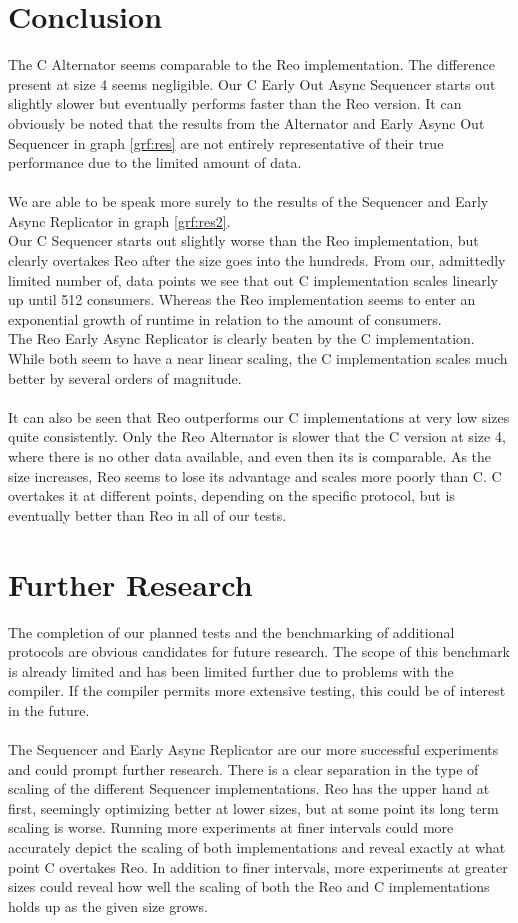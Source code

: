 \section{Conclusion}
The C Alternator seems comparable to the Reo implementation. The difference present at size 4 seems negligible. Our C Early Out Async Sequencer starts out slightly slower but eventually performs faster than the Reo version. It can obviously be noted that the results from the Alternator and Early Async Out Sequencer in graph \ref{grf:res} are not entirely representative of their true performance due to the limited amount of data.\\\\
%
We are able to be speak more surely to the results of the Sequencer and Early Async Replicator in graph \ref{grf:res2}. \\
Our C Sequencer starts out slightly worse than the Reo implementation, but clearly overtakes Reo after the size goes into the hundreds. From our, admittedly limited number of, data points we see that out C implementation scales linearly up until 512 consumers. Whereas the Reo implementation seems to enter an exponential growth of runtime in relation to the amount of consumers.\\
The Reo Early Async Replicator is clearly beaten by the C implementation. While both seem to have a near linear scaling, the C implementation scales much better by several orders of magnitude.\\\\
%
It can also be seen that Reo outperforms our C implementations at very low sizes quite consistently. Only the Reo Alternator is slower that the C version at size 4, where there is no other data available, and even then its is comparable. As the size increases, Reo seems to lose its advantage and scales more poorly than C. C overtakes it at different points, depending on the specific protocol, but is eventually better than Reo in all of our tests.

\section{Further Research}
The completion of our planned tests and the benchmarking of additional protocols are obvious candidates for future research. The scope of this benchmark is already limited and has been limited further due to problems with the compiler. If the compiler permits more extensive testing, this could be of interest in the future.\\\\
%
The Sequencer and Early Async Replicator are our more successful experiments and could prompt further research.
There is a clear separation in the type of scaling of the different Sequencer implementations. Reo has the upper hand at first, seemingly optimizing better at lower sizes, but at some point its long term scaling is worse. Running more experiments at finer intervals could more accurately depict the scaling of both implementations and reveal exactly at what point C overtakes Reo. In addition to finer intervals, more experiments at greater sizes could reveal how well the scaling of both the Reo and C implementations holds up as the given size grows.
